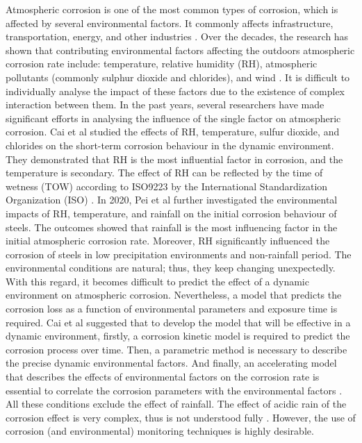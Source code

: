 Atmospheric corrosion is one of the most common types of corrosion, which is affected by several environmental factors. It commonly affects infrastructure, transportation, energy, and other industries \cite{pei2021understanding}. Over the decades, the research has shown that contributing environmental factors affecting the outdoors atmospheric corrosion rate include: temperature, relative humidity (RH), atmospheric pollutants (commonly sulphur dioxide and chlorides), and wind \cite{abou2001mechanical, islam2018effects}. It is difficult to individually analyse the impact of these factors due to the existence of complex interaction between them.
In the past years, several researchers have made significant efforts in analysing the influence of the single factor on atmospheric corrosion. Cai et al \cite{cai2018influence} studied the effects of RH, temperature, sulfur dioxide, and chlorides on the short-term corrosion behaviour in the dynamic environment. They demonstrated that RH is the most influential factor in corrosion, and the temperature is secondary. The effect of RH can be reflected by the time of wetness (TOW) according to ISO9223 by the International Standardization Organization (ISO) \cite{cengel1998heat, islam2018effects}. In 2020, Pei et al \cite{pei2021understanding} further investigated the environmental impacts of RH, temperature, and rainfall on the initial corrosion behaviour of steels. The outcomes showed that rainfall is the most influencing factor in the initial atmospheric corrosion rate.  Moreover, RH significantly influenced the corrosion of steels in low precipitation environments and non-rainfall period.
The environmental conditions are natural; thus, they keep changing unexpectedly. With this regard, it becomes difficult to predict the effect of a dynamic environment on atmospheric corrosion. Nevertheless, a model that predicts the corrosion loss as a function of environmental parameters and exposure time is required. Cai et al \cite{cai2018influence} suggested that to develop the model that will be effective in a dynamic environment, firstly, a corrosion kinetic model is required to predict the corrosion process over time. Then, a parametric method is necessary to describe the precise dynamic environmental factors. And finally, an accelerating model that describes the effects of environmental factors on the corrosion rate is essential to correlate the corrosion parameters with the environmental factors \cite{loto2019performance}. All these conditions exclude the effect of rainfall. The effect of acidic rain of the corrosion effect is very complex, thus is not understood fully \cite{pei2021understanding}. However, the use of corrosion (and environmental) monitoring techniques is highly desirable.

